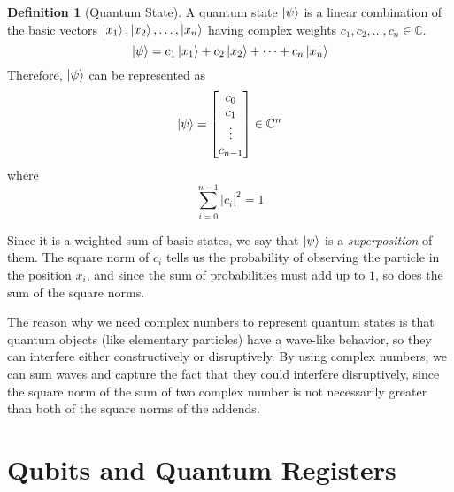 \documentclass[12pt,a4paper]{report}
\theoremstyle{definition}
\newtheorem{definition}{Definition}[section]
\theoremstyle{definition}
\theoremstyle{definition}
\begin{document}
\begin{definition}[Quantum State]
A quantum state $\ket{\psi}$ is a linear combination of the basic vectors $\ket{x_1}, \ket{x_2}, \ldots, \ket{x_n}$ having complex weights $c_1, c_2, \ldots, c_n \in \mathbb{C}$.
\begin{equation*}
    \ket{\psi}=c_1\ket{x_1}+c_2\ket{x_2}+\cdots+c_n\ket{x_n}
\end{equation*}
Therefore, $\ket{\psi}$ can be represented as
\begin{equation*}
    \ket{\psi}=\begin{bmatrix}
        c_0\\
        c_1\\
        \vdots\\
        c_{n-1}\\
    \end{bmatrix}\in \mathbb{C}^n
\end{equation*}
where
\begin{equation*}
    \sum_{i=0}^{n-1} \left\lvert c_i \right\rvert ^2 = 1
\end{equation*}
\end{definition}
Since it is a weighted sum of basic states, we say that $\ket{\psi}$ is a \textit{superposition} of them.
The square norm of $c_i$ tells us the probability of observing the particle in the position $x_i$, and since the sum of probabilities must add up to $1$, so does the sum of the square norms.

The reason why we need complex numbers to represent quantum states is that quantum objects (like elementary particles) have a wave-like behavior, so they can interfere either constructively or disruptively. By using complex numbers, we can sum waves and capture the fact that they could interfere disruptively, since the square norm of the sum of two complex number is not necessarily greater than both of the square norms of the addends.



\section{Qubits and Quantum Registers}
\end{document}
